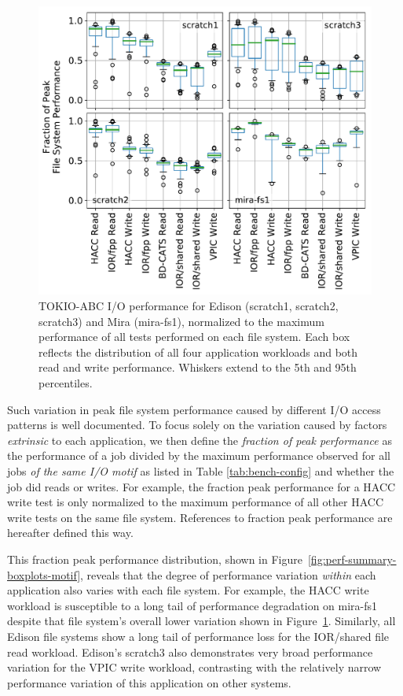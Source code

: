 \begin{figure}[t]
    \centering
    \includegraphics[width=1.0\columnwidth]{figs/perf-boxplots-per-fs.pdf}
    \caption{TOKIO-ABC I/O performance for Edison (scratch1, scratch2, scratch3) and Mira (mira-fs1), normalized to the maximum performance of all tests performed on each file system.
    Each box reflects the distribution of all four application workloads and both read and write performance.
    Whiskers extend to the 5th and 95th percentiles.}
    \label{fig:perf-summary-boxplots-fs}
\vspace{-.2in}
\end{figure}

Such variation in peak file system performance caused by different I/O access patterns is well documented\cite{Lofstead2010,Uselton2010,Xie2012}.
To focus solely on the variation caused by factors \emph{extrinsic} to each application, we then define the \emph{fraction of peak performance} as the performance of a job divided by the maximum performance observed for all jobs \emph{of the same I/O motif} as listed in Table \ref{tab:bench-config} and whether the job did reads or writes.
For example, the fraction peak performance for a HACC write test is only normalized to the maximum performance of all other HACC write tests on the same file system.
References to fraction peak performance are hereafter defined this way.

This fraction peak performance distribution, shown in Figure~\ref{fig:perf-summary-boxplots-motif}, reveals that the degree of performance variation \emph{within} each application also varies with each file system.
For example, the HACC write workload is susceptible to a long tail of performance degradation on mira-fs1 despite that file system's overall lower variation shown in Figure~\ref{fig:perf-summary-boxplots-fs}.
Similarly, all Edison file systems show a long tail of performance loss for the IOR/shared file read workload.
Edison's scratch3 also demonstrates very broad performance variation for the VPIC write workload, contrasting with the relatively narrow performance variation of this application on other systems.

